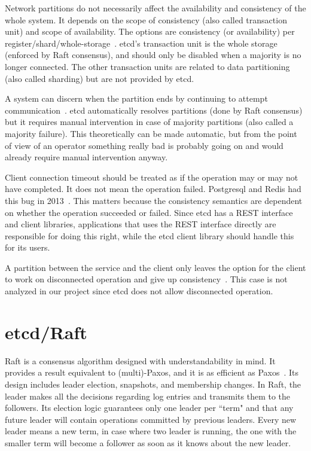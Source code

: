 \documentclass[12pt,conference]{IEEEtran}
\begin{document}
Network partitions do not necessarily affect the availability and consistency of the whole system. It depends on the scope of consistency (also called transaction unit) and scope of availability. The options are consistency (or availability) per register/shard/whole-storage~\cite{brewer2012cap}. etcd's transaction unit is the whole storage (enforced by Raft consensus), and should only be disabled when a majority is no longer connected. The other transaction units are related to data partitioning (also called sharding) but are not provided by etcd.

A system can discern when the partition ends by continuing to attempt communication~\cite{brewer2012cap}. etcd automatically resolves partitions (done by Raft consensus) but it requires manual intervention in case of majority partitions (also called a majority failure). This theoretically can be made automatic, but from the point of view of an operator something really bad is probably going on and would already require manual intervention anyway.

Client connection timeout should be treated as if the operation may or may not have completed. It does not mean the operation failed. Postgresql and Redis had this bug in 2013~\cite{postgresJepsenPostWebsite}. This matters because the consistency semantics are dependent on whether the operation succeeded or failed. Since etcd has a REST interface and client libraries, applications that uses the REST interface directly are responsible for doing this right, while the etcd client library should handle this for its users.

A partition between the service and the client only leaves the option for the client to work on disconnected operation and give up consistency~\cite{brewer2012cap}. This case is not analyzed in our project since etcd does not allow disconnected operation.

\section{etcd/Raft}

Raft is a consensus algorithm designed with understandability in mind. It provides a result equivalent to (multi)-Paxos, and it is as efficient as Paxos~\cite{ongaro2014search}. Its design includes leader election, snapshots, and membership changes. In Raft, the leader makes all the decisions regarding log entries and transmits them to the followers. Its election logic guarantees only one leader per ``term" and that any future leader will contain operations committed by previous leaders. Every new leader means a new term, in case where two leader is running, the one with the smaller term will become a follower as soon as it knows about the new leader.
\end{document}
